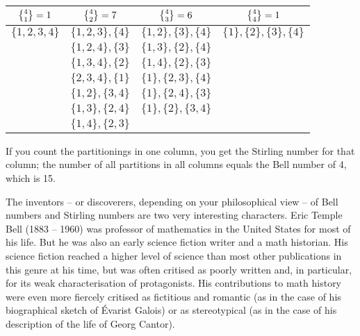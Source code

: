 \documentclass{scrreprt}
\begin{document}
\bgroup
\renewcommand{\arraystretch}{1.3}
\begin{center}
\begin{tabular}{|c|c|c|c|}\hline
$\stirlingTwo{4}{1} = 1$ & $\stirlingTwo{4}{2} = 7$ & 
$\stirlingTwo{4}{3} = 6$ &  $\stirlingTwo{4}{4} = 1$\\\hline\hline
$\lbrace 1,2,3,4\rbrace$ & 
$\lbrace 1,2,3\rbrace, \lbrace 4\rbrace$ & 
$\lbrace 1,2\rbrace, \lbrace 3\rbrace, \lbrace 4\rbrace$ & 
$\lbrace 1\rbrace, \lbrace 2\rbrace, \lbrace 3\rbrace, \lbrace 4\rbrace$ \\\cline{2-3}
 & 
$\lbrace 1,2,4\rbrace, \lbrace 3\rbrace$ & 
$\lbrace 1,3\rbrace, \lbrace 2\rbrace, \lbrace 4\rbrace$ & \\\cline{2-3}
 & 
$\lbrace 1,3,4\rbrace, \lbrace 2\rbrace$ & 
$\lbrace 1,4\rbrace, \lbrace 2\rbrace, \lbrace 3\rbrace$ & \\\cline{2-3}
 & 
$\lbrace 2,3,4\rbrace, \lbrace 1\rbrace$ & 
$\lbrace 1\rbrace, \lbrace 2,3\rbrace, \lbrace 4\rbrace$ & \\\cline{2-3}
 & 
$\lbrace 1,2\rbrace, \lbrace 3,4\rbrace$ & 
$\lbrace 1\rbrace, \lbrace 2,4\rbrace, \lbrace 3\rbrace$ & \\\cline{2-3}
 & 
$\lbrace 1,3\rbrace, \lbrace 2,4\rbrace$ & 
$\lbrace 1\rbrace, \lbrace 2\rbrace, \lbrace 3,4\rbrace$ &  \\\cline{2-3}
 & 
$\lbrace 1,4\rbrace, \lbrace 2,3\rbrace$ &  & \\\hline
\end{tabular}
\end{center}
\egroup

If you count the partitionings in one column,
you get the Stirling number for that column;
the number of all partitions in all columns
equals the Bell number of 4, which is 15.

The inventors -- or discoverers, depending on 
your philosophical view -- of Bell numbers and Stirling numbers
are two very interesting characters.
Eric Temple Bell (1883 -- 1960) was professor of mathematics
in the United States for most of his life.
But he was also an early science fiction writer
and a math historian.
His science fiction reached a higher level of science
than most other publications in this genre at his time,
but was often critised as poorly written and, in particular,
for its weak characterisation of protagonists.
His contributions to math history were even more fiercely critised as
fictitious and romantic (as in the case of his biographical sketch
of Évarist Galois) or as stereotypical (as in the case
of his description of the life of Georg Cantor).
\end{document}
